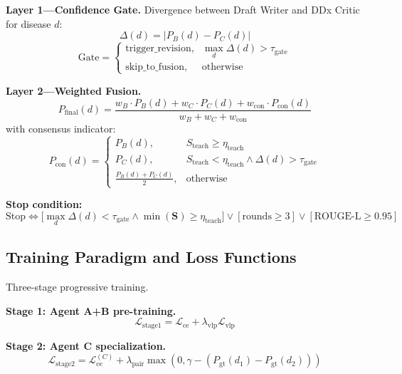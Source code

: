 \documentclass[runningheads,10pt]{llncs}
\newcommand{\Steach}{S_{\text{teach}}}
\newcommand{\Lce}{\mathcal{L}_{\text{ce}}}
\newcommand{\Lvlp}{\mathcal{L}_{\text{vlp}}}
\begin{document}
\textbf{Layer 1---Confidence Gate.} Divergence between Draft Writer and DDx Critic for disease $d$:
\begin{equation}
\Delta(d) = |P_B(d) - P_C(d)| \label{eq:divergence}
\end{equation}
\begin{equation}
\text{Gate} = \begin{cases}
\text{trigger\_revision}, & \max_d \Delta(d) > \tau_{\text{gate}} \\
\text{skip\_to\_fusion}, & \text{otherwise}
\end{cases} \label{eq:gate}
\end{equation}

\textbf{Layer 2---Weighted Fusion.}
\begin{equation}
P_{\text{final}}(d) = \frac{w_B \cdot P_B(d) + w_C \cdot P_C(d) + w_{\text{con}} \cdot P_{\text{con}}(d)}{w_B + w_C + w_{\text{con}}} \label{eq:fusion}
\end{equation}
with consensus indicator:
\begin{equation}
P_{\text{con}}(d) = \begin{cases}
P_B(d), & \Steach \geq \eta_{\text{teach}} \\
P_C(d), & \Steach < \eta_{\text{teach}} \land \Delta(d) > \tau_{\text{gate}} \\
\frac{P_B(d) + P_C(d)}{2}, & \text{otherwise}
\end{cases} \label{eq:conind}
\end{equation}

\textbf{Stop condition:}
\begin{equation}
\text{Stop} \iff \bigl[ \max_d \Delta(d) < \tau_{\text{gate}} \land \min(\mathbf{S}) \geq \eta_{\text{teach}} \bigr] \lor [\text{rounds} \geq 3] \lor [\text{ROUGE-L} \geq 0.95] \label{eq:stop}
\end{equation}

\subsection{Training Paradigm and Loss Functions}

Three-stage progressive training.

\textbf{Stage 1: Agent A+B pre-training.}
\begin{equation}
\mathcal{L}_{\text{stage1}} = \Lce + \lambda_{\text{vlp}} \Lvlp \label{eq:stage1}
\end{equation}

\textbf{Stage 2: Agent C specialization.}
\begin{equation}
\mathcal{L}_{\text{stage2}} = \Lce^{(C)} + \lambda_{\text{pair}} \max(0, \gamma - (P_{\text{gt}}(d_1) - P_{\text{gt}}(d_2))) \label{eq:stage2}
\end{equation}
\end{document}

